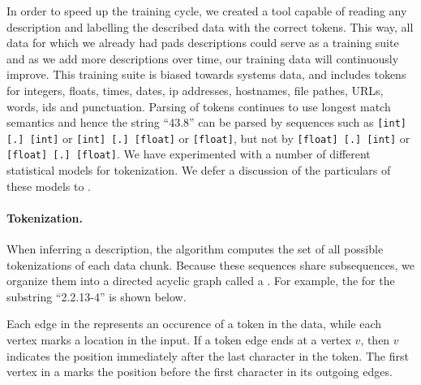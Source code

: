 In order to speed up the training cycle, we created a tool
capable of reading any \pads{} description and labelling the
described data with the correct tokens.  This way,
all data for which we already had pads descriptions could serve as a training
suite and as we add more descriptions over time, our training data will 
continuously improve.  This training suite is biased towards systems 
data, and includes
tokens for integers, floats, times, dates, ip addresses, hostnames, 
file pathes, URLs, words, ids and punctuation. 
Parsing of tokens continues to use longest match semantics
and hence the string ``43.8'' can be parsed by sequences such as
{\tt [int] [.] [int]} or {\tt [int] [.] [float]} or {\tt [float]},
but not by {\tt [float] [.] [int]} or {\tt [float] [.] [float]}.
We have experimented with a number of different statistical models for
tokenization.  We defer a discussion of the particulars of these
models to .

\paragraph*{Tokenization.}

When inferring a description, the algorithm computes the set of all
possible tokenizations of each data chunk.  Because these sequences
share subsequences, we organize them into a directed acyclic graph
called a \seqset{}.  For example, the \seqset{} for the substring 
``2.2.13-4'' is shown below.


\begin{center}
\end{center}
Each edge in the \seqset{} represents an occurence of a token in the
data, while each vertex marks a location in the input.  If a token
edge ends at a vertex $v$, then $v$ indicates the position immediately
after the last character in the token.  The first vertex in a
\seqset{} marks the position before the first character in its
outgoing edges. 

